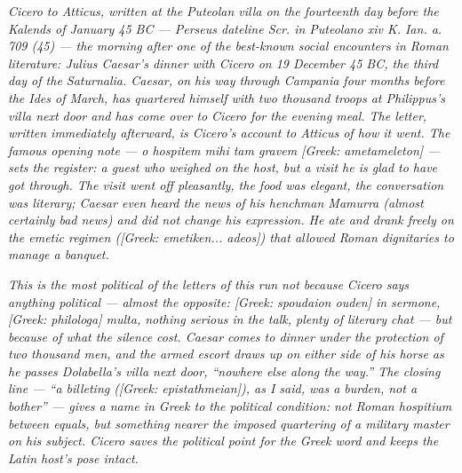 
\textit{Cicero to Atticus, written at the Puteolan villa on the
fourteenth day before the Kalends of January 45 BC --- Perseus
dateline \textit{Scr. in Puteolano xiv K. Ian. a. 709 (45)} ---
the morning after one of the best-known social encounters in
Roman literature: Julius Caesar's dinner with Cicero on 19
December 45 BC, the third day of the Saturnalia. Caesar, on his
way through Campania four months before the Ides of March, has
quartered himself with two thousand troops at Philippus's villa
next door and has come over to Cicero for the evening meal. The
letter, written immediately afterward, is Cicero's account to
Atticus of how it went. The famous opening note ---
\textit{o hospitem mihi tam gravem [Greek: ametameleton]} ---
sets the register: a guest who weighed on the host, but a visit
he is glad to have got through. The visit went off pleasantly,
the food was elegant, the conversation was literary; Caesar even
heard the news of his henchman Mamurra (almost certainly bad
news) and did not change his expression. He ate and drank
freely on the emetic regimen
(\textit{[Greek: emetiken... adeos]}) that allowed Roman
dignitaries to manage a banquet.}

\textit{This is the most political of the letters of this run not
because Cicero says anything political --- almost the opposite:
\textit{[Greek: spoudaion ouden] in sermone,
[Greek: philologa] multa}, nothing serious in the talk, plenty
of literary chat --- but because of what the silence cost.
Caesar comes to dinner under the protection of two thousand
men, and the armed escort draws up on either side of his horse
as he passes Dolabella's villa next door, ``nowhere else along
the way.'' The closing line --- ``a billeting
(\textit{[Greek: epistathmeian]}), as I said, was a burden, not
a bother'' --- gives a name in Greek to the political
condition: not Roman \textit{hospitium} between equals, but
something nearer the imposed quartering of a military master on
his subject. Cicero saves the political point for the Greek
word and keeps the Latin host's pose intact.}
